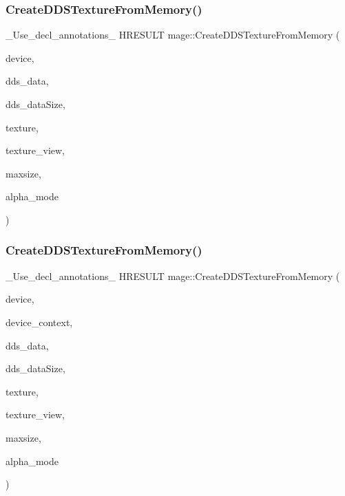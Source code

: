 \subsubsection{\texorpdfstring{Create\+D\+D\+S\+Texture\+From\+Memory()}{CreateDDSTextureFromMemory()}\hspace{0.1cm}{\footnotesize\ttfamily [3/4]}}
{\footnotesize\ttfamily \+\_\+\+Use\+\_\+decl\+\_\+annotations\+\_\+ H\+R\+E\+S\+U\+LT mage\+::\+Create\+D\+D\+S\+Texture\+From\+Memory (\begin{DoxyParamCaption}\item[{I\+D3\+D11\+Device2 $\ast$}]{device,  }\item[{const uint8\+\_\+t $\ast$}]{dds\+\_\+data,  }\item[{size\+\_\+t}]{dds\+\_\+data\+Size,  }\item[{I\+D3\+D11\+Resource $\ast$$\ast$}]{texture,  }\item[{I\+D3\+D11\+Shader\+Resource\+View $\ast$$\ast$}]{texture\+\_\+view,  }\item[{size\+\_\+t}]{maxsize,  }\item[{\hyperlink{namespacemage_a0c586a2bad862f4858900ca121ca80c2}{D\+D\+S\+\_\+\+A\+L\+P\+H\+A\+\_\+\+M\+O\+DE} $\ast$}]{alpha\+\_\+mode }\end{DoxyParamCaption})}

\hypertarget{namespacemage_ad4aea1524bc1c8262da263d10cea5b5d}{}\label{namespacemage_ad4aea1524bc1c8262da263d10cea5b5d} 
\subsubsection{\texorpdfstring{Create\+D\+D\+S\+Texture\+From\+Memory()}{CreateDDSTextureFromMemory()}\hspace{0.1cm}{\footnotesize\ttfamily [4/4]}}
{\footnotesize\ttfamily \+\_\+\+Use\+\_\+decl\+\_\+annotations\+\_\+ H\+R\+E\+S\+U\+LT mage\+::\+Create\+D\+D\+S\+Texture\+From\+Memory (\begin{DoxyParamCaption}\item[{I\+D3\+D11\+Device2 $\ast$}]{device,  }\item[{I\+D3\+D11\+Device\+Context $\ast$}]{device\+\_\+context,  }\item[{const uint8\+\_\+t $\ast$}]{dds\+\_\+data,  }\item[{size\+\_\+t}]{dds\+\_\+data\+Size,  }\item[{I\+D3\+D11\+Resource $\ast$$\ast$}]{texture,  }\item[{I\+D3\+D11\+Shader\+Resource\+View $\ast$$\ast$}]{texture\+\_\+view,  }\item[{size\+\_\+t}]{maxsize,  }\item[{\hyperlink{namespacemage_a0c586a2bad862f4858900ca121ca80c2}{D\+D\+S\+\_\+\+A\+L\+P\+H\+A\+\_\+\+M\+O\+DE} $\ast$}]{alpha\+\_\+mode }\end{DoxyParamCaption})}

